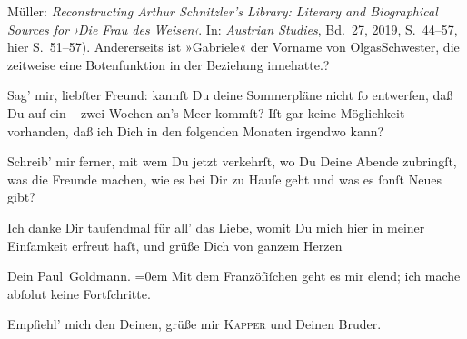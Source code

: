 {{{{                        Müller: \emph{Reconstructing Arthur Schnitzler’s Library:
                           Literary and Biographical Sources for ›Die Frau des Weisen‹}. In:
                           \emph{Austrian Studies}, Bd. 27, 2019, S. 44–57, hier S. 51–57). Andererseits ist
                     »Gabriele« der Vorname von OlgasSchwester, die
                     zeitweise eine Botenfunktion in der Beziehung innehatte.}}}\label{K_L02668-17}}?\pend
           
\pstart
           Sag’ mir, liebſter Freund: kannſt Du deine  Sommerpläne nicht ſo entwerfen, daß Du auf ein – zwei Wochen an’s Meer kommſt?
               Iſt gar keine Möglichkeit vorhanden, daß ich Dich in \introOben{}den\introOben{}
               folgenden Monaten irgendwo \label{K_L02668-18v}\label{K_L02668-18}
               kann?\pend
           
\pstart
           Schreib’ mir ferner, mit wem Du jetzt verkehrſt, wo Du Deine Abende zubringſt, was
                  {\pb}die Freunde machen, wie es bei Dir zu Hauſe geht
               und was es ſonſt Neues gibt?\pend
           
\pstart
           Ich danke Dir tauſendmal für all’ das Liebe, womit Du mich hier in meiner Einſamkeit
               erfreut haſt, und grüße Dich von ganzem Herzen\pend
           
\pstart
           Dein \damage{\textcolor{gray}{treuer}}{\\[\baselineskip]}\spacefill\mbox{Paul Goldmann.}\pend
           \leftskip=0em{}
\pstart
           \noindent{}Mit dem Franzöſiſchen geht es mir elend; ich mache abſolut keine Fortſchritte.\pend
           
\pstart
           Empfiehl’ mich den Deinen, grüße mir \textsc{Kapper} und Deinen Bruder.\pend
           \endnumbering{}  
      